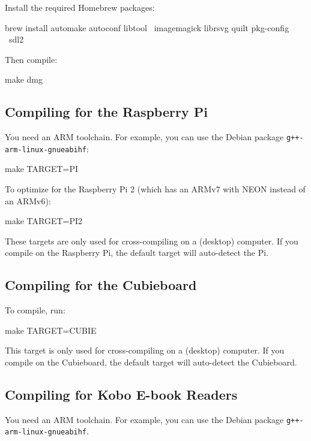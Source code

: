 Install the required Homebrew packages:

\begin{verbatim*}
brew install automake autoconf libtool \
  imagemagick librsvg quilt pkg-config \
  sdl2
\end{verbatim*}

Then compile:

\begin{verbatim*}
make dmg
\end{verbatim*}

\subsection{Compiling for the Raspberry Pi}

You need an ARM toolchain.  For example, you can use the Debian
package \verb|g++-arm-linux-gnueabihf|:

\begin{verbatim*}
make TARGET=PI
\end{verbatim*}

To optimize for the Raspberry Pi 2 (which has an ARMv7 with NEON
instead of an ARMv6):

\begin{verbatim*}
make TARGET=PI2
\end{verbatim*}

These targets are only used for cross-compiling on a (desktop)
computer.
If you compile on the Raspberry Pi, the default target will
auto-detect the Pi.

\subsection{Compiling for the Cubieboard}

To compile, run:

\begin{verbatim*}
make TARGET=CUBIE
\end{verbatim*}

This target is only used for cross-compiling on a (desktop) computer.
If you compile on the Cubieboard, the default target will auto-detect
the Cubieboard.

\subsection{Compiling for Kobo E-book Readers}

You need an ARM toolchain.  For example, you can use the Debian
package \verb|g++-arm-linux-gnueabihf|.

